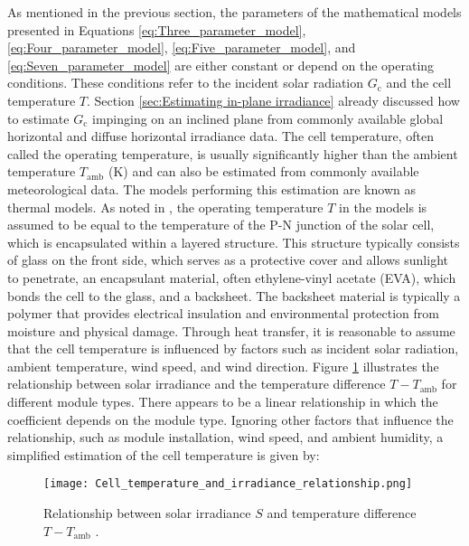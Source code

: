As mentioned in the previous section, the parameters of the mathematical
models presented in Equations \ref{eq:Three_parameter_model},
\ref{eq:Four_parameter_model}, \ref{eq:Five_parameter_model}, and
\ref{eq:Seven_parameter_model} are either constant or depend on the
operating conditions. These conditions refer to the incident solar
radiation \(G_{\text{c}}\) and the cell temperature \(T\).
Section \ref{sec:Estimating in-plane irradiance} already discussed
how to estimate \(G_{\text{c}}\) impinging on an inclined plane from commonly
available global horizontal and diffuse horizontal irradiance data.
The cell temperature, often called the operating temperature, is
usually significantly higher than the ambient temperature \(T_{\text{amb}}\) (K)
and can also be estimated from commonly available meteorological data. The
models performing this estimation are known as thermal models. As noted in
\cite{Ma2014_1}, the operating temperature \(T\) in the models is assumed to be
equal to the temperature of the P-N junction of the solar cell, which is
encapsulated within a layered structure. This structure typically consists
of glass on the front side, which serves as a protective cover and allows
sunlight to penetrate, an encapsulant material, often ethylene-vinyl acetate
(EVA), which bonds the cell to the glass, and a backsheet. The backsheet
material is typically a polymer that provides electrical insulation and
environmental protection from moisture and physical damage.
Through heat transfer, it is reasonable to assume that the cell
temperature is influenced by factors such as incident solar
radiation, ambient temperature, wind speed, and wind direction.
Figure \ref{fig:Cell_temperature_and_irradiance_relationship} illustrates
the relationship between solar irradiance and the temperature
difference \(T - T_{\text{amb}}\) for different module types.
There appears to be a linear relationship in which the coefficient
depends on the module type. Ignoring other factors that influence
the relationship, such as module installation, wind speed, and
ambient humidity, a simplified estimation of the cell temperature
is given by:

\begin{figure}
    \centering
    \texttt{[image: Cell\_temperature\_and\_irradiance\_relationship.png]}
    \caption{\small Relationship between solar irradiance \(S\) and temperature difference \(T-T_{\text{amb}}\) \cite{Ross1986}.}
    \label{fig:Cell_temperature_and_irradiance_relationship}
\end{figure}

